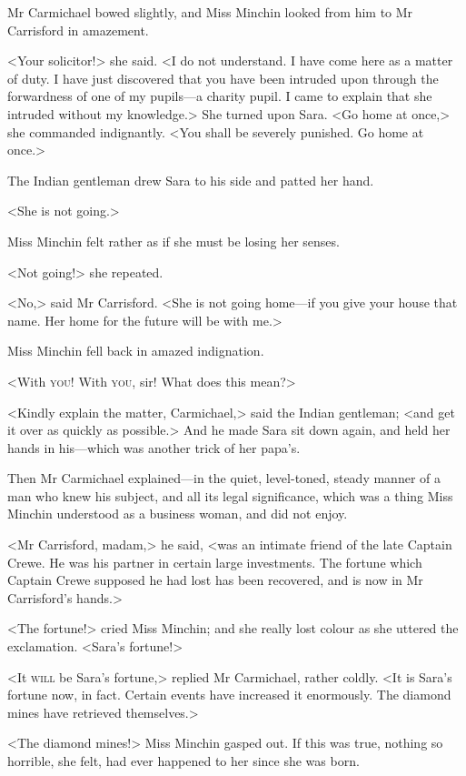 Mr Carmichael bowed slightly, and Miss Minchin looked from him to Mr Carrisford in amazement.

<Your solicitor!> she said. <I do not understand. I have come here as a matter of duty. I have just discovered that you have been intruded upon through the forwardness of one of my pupils—a charity pupil. I came to explain that she intruded without my knowledge.> She turned upon Sara. <Go home at once,> she commanded indignantly. <You shall be severely punished. Go home at once.>

The Indian gentleman drew Sara to his side and patted her hand.

<She is not going.>

Miss Minchin felt rather as if she must be losing her senses.

<Not going!> she repeated.

<No,> said Mr Carrisford. <She is not going home—if you give your house that name. Her home for the future will be with me.>

Miss Minchin fell back in amazed indignation.

<With \textsc{you}! With \textsc{you,} sir! What does this mean?>

<Kindly explain the matter, Carmichael,> said the Indian gentleman; <and get it over as quickly as possible.> And he made Sara sit down again, and held her hands in his—which was another trick of her papa's.

Then Mr Carmichael explained—in the quiet, level-toned, steady manner of a man who knew his subject, and all its legal significance, which was a thing Miss Minchin understood as a business woman, and did not enjoy.

<Mr Carrisford, madam,> he said, <was an intimate friend of the late Captain Crewe. He was his partner in certain large investments. The fortune which Captain Crewe supposed he had lost has been recovered, and is now in Mr Carrisford's hands.>

<The fortune!> cried Miss Minchin; and she really lost colour as she uttered the exclamation. <Sara's fortune!>

<It \textsc{will} be Sara's fortune,> replied Mr Carmichael, rather coldly. <It is Sara's fortune now, in fact. Certain events have increased it enormously. The diamond mines have retrieved themselves.>

<The diamond mines!> Miss Minchin gasped out. If this was true, nothing so horrible, she felt, had ever happened to her since she was born.

